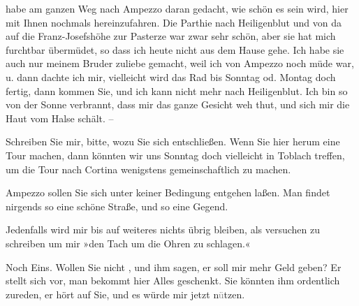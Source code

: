                habe am ganzen Weg nach Ampezzo daran gedacht,
               wie schön es sein wird, hier mit Ihnen nochmals hereinzufahren. Die Parthie nach Heiligenblut und von da auf die Franz-Josefshöhe zur Pasterze war zwar sehr schön, aber sie hat mich furchtbar
               übermüdet, so dass ich heute nicht aus dem Hause gehe.
               Ich habe sie auch nur meinem Bruder zuliebe gemacht, weil ich von Ampezzo noch müde war, u. dann dachte ich mir, vielleicht
               wird das Rad bis Sonntag od. Montag doch fertig, dann kommen Sie, und ich kann nicht mehr nach Heiligenblut. Ich bin so von der Sonne
               verbrannt, dass mir das ganze Gesicht weh thut, und sich mir die Haut vom Halse
               schält. –\pend
           
\pstart
           {\pb}Schreiben Sie mir, bitte,
               wozu Sie sich entschließen. Wenn Sie hier herum eine Tour machen, dann könnten wir
               uns Sonntag doch vielleicht in Toblach treffen, um die Tour nach Cortina wenigstens gemeinschaftlich zu machen.\pend
           
\pstart
           Ampezzo sollen Sie sich unter keiner Bedingung
               entgehen laßen. Man findet nirgends so eine schöne Straße, und so eine Gegend.\pend
           
\pstart
           Jedenfalls wird mir bis auf weiteres nichts übrig bleiben, als versuchen zu
                  schreiben um mir »den Tach um die Ohren zu schlagen.«\pend
           
\pstart
           Noch Eins. Wollen Sie nicht \label{K_L03128-6v}\label{K_L03128-6}, und ihm sagen, er
               soll mir mehr Geld geben? Er stellt sich vor, man bekommt hier Alles geschenkt. Sie
               könnten ihm ordentlich zureden, er hört auf Sie, und es würde mir jetzt
                  n\textcolor{gray}{ü}tzen.\pend
           
